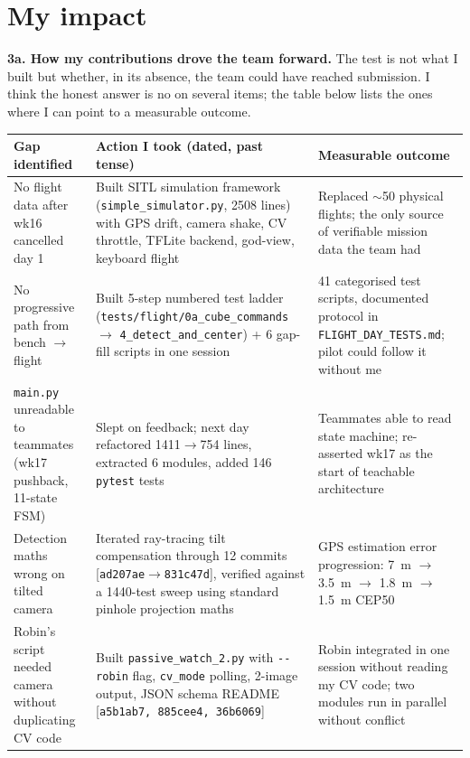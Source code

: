 \section{My impact}

\textbf{3a. How my contributions drove the team forward.}  The test is not what I built but whether, in its absence, the team could have reached submission. I think the honest answer is no on several items; the table below lists the ones where I can point to a measurable outcome.

{\footnotesize
\begin{tabularx}{\textwidth}{@{}p{3.4cm} X p{4.3cm}@{}}
\toprule
\textbf{Gap identified} & \textbf{Action I took (dated, past tense)} & \textbf{Measurable outcome} \\
\midrule
No flight data after wk16 cancelled day 1 & Built SITL simulation framework (\texttt{simple\_simulator.py}, 2508 lines) with GPS drift, camera shake, CV throttle, TFLite backend, god-view, keyboard flight & Replaced $\sim$50 physical flights; the only source of verifiable mission data the team had \cite{complaintletter} \\
No progressive path from bench $\to$ flight & Built 5-step numbered test ladder (\texttt{tests/flight/0a\_cube\_commands} $\to$ \texttt{4\_detect\_and\_center}) + 6 gap-fill scripts in one session & 41 categorised test scripts, documented protocol in \texttt{FLIGHT\_DAY\_TESTS.md}; pilot could follow it without me \\
\texttt{main.py} unreadable to teammates (wk17 pushback, 11-state FSM) & Slept on feedback; next day refactored 1411$\to$754 lines, extracted 6 modules, added 146 \texttt{pytest} tests \cite{mainrefactor} & Teammates able to read state machine; re-asserted wk17 as the start of teachable architecture \\
Detection maths wrong on tilted camera & Iterated ray-tracing tilt compensation through 12 commits [\texttt{ad207ae}$\to$\texttt{831c47d}], verified against a 1440-test sweep using standard pinhole projection maths & GPS estimation error progression: 7~m $\to$ 3.5~m $\to$ 1.8~m $\to$ 1.5~m CEP50 \cite{gpsestaccuracy} \\
Robin's script needed camera without duplicating CV code & Built \texttt{passive\_watch\_2.py} with \texttt{-{}-robin} flag, \texttt{cv\_mode} polling, 2-image output, JSON schema README \cite{robinhandoff} [\texttt{a5b1ab7, 885cee4, 36b6069}] & Robin integrated in one session without reading my CV code; two modules run in parallel without conflict \\

\end{tabularx}}
